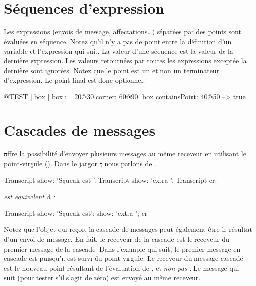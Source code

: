 \documentclass[a4paper,10pt,twoside]{book}
\begin{document}
\section{S\'equences d'expression}
Les expressions (\ie envois de message, affectations\ldots) s\'epar\'ees par des points sont \'evalu\'ees en s\'equence.
Notez qu'il n'y a pas de point entre la d\'efinition d'un variable et l'expression qui suit.
La valeur d'une s\'equence est la valeur de la derni\`ere
expression. Les valeurs retourn\'ees par toutes les expressions
except\'ee la derni\`ere sont ignor\'ees. Notez que le point est un 
et non un terminateur d'expression. Le point final est donc optionnel.

\begin{code}{@TEST}
| box |
box := 20@30 corner: 60@90.
box containsPoint: 40@50 --> true
\end{code}

\section{Cascades de messages}
\st offre la possibilit\'e d'envoyer plusieurs messages au m\^eme
receveur en utilisant le point-virgule (\ct{;}). Dans le jargon \st,
nous parlons de .


\begin{minipage}{0.3\textwidth}
\begin{code}{}
Transcript show: 'Squeak est '.
Transcript show: 'extra '.
Transcript cr.
\end{code}
\end{minipage}
\emph{est \'equivalent \`a :}
\begin{minipage}{0.3\textwidth}
\begin{code}{}
Transcript        
   show: 'Squeak est';
   show: 'extra ';
   cr
\end{code}
\end{minipage}

Notez que l'objet qui re\c{c}oit la cascade de messages peut \'egalement \^etre le r\'esultat d'un envoi de message.
En fait, le receveur de la cascade est le receveur du premier message
de la cascade. Dans l'exemple qui suit, le premier message en cascade
est  puisqu'il est suivi du point-virgule. Le receveur
du message cascad\'e  est le nouveau point r\'esultant
de l'\'evaluation de , et \emph{non pas} . Le
message qui suit  (pour tester s'il s'agit de z\'ero) est
envoy\'e au m\^eme receveur. 
\end{document}
